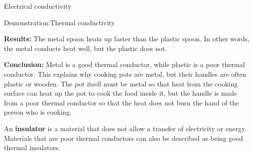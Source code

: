 \begin{iexperiment}{Electrical conductivity}
\begin{gexperiment}{Demonstration:Thermal conductivity}
{      \label{m38706*id66666}\noindent{}\textbf{Results: }\newline
    The metal spoon heats up faster than the plastic spoon. In other words, the metal conducts heat well, but the plastic does not.\par 
\label{m38706*id66687}\noindent{}\textbf{Conclusion: }Metal is a good thermal conductor, while plastic is a poor thermal conductor. This explains why cooking pots are metal, but their handles are often plastic or wooden. The pot itself must be metal so that heat from the cooking surface can heat up the pot to cook the food inside it, but the handle is made from a poor thermal conductor so that the heat does not burn the hand of the person who is cooking.}
 \par 
      \label{m38706*id66699}An \textbf{insulator} is a material that does not allow a transfer of electricity or energy. Materials that are poor thermal conductors can also be described as being good thermal insulators.\par 

\end{gexperiment}
\end{iexperiment}
